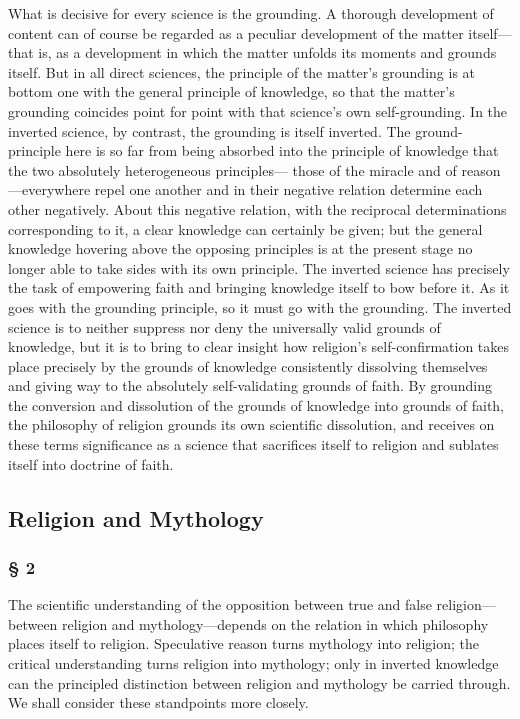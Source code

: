 \documentclass[12pt,a4paper]{article}
\begin{document}
What is decisive for every science is the grounding. A thorough
development of content can of course be regarded as a peculiar
development of the matter itself---that is, as a development in
which the matter unfolds its moments and grounds itself. But in
all direct sciences, the principle of the matter's grounding is
at bottom one with the general principle of knowledge, so that
the matter's grounding coincides point for point with that
science's own self-grounding. In the inverted science, by
contrast, the grounding is itself inverted. The ground-principle
here is so far from being absorbed into the principle of
knowledge that the two absolutely heterogeneous principles---
those of the miracle and of reason---everywhere repel one
another and in their negative relation determine each other
negatively. About this negative relation, with the
reciprocal determinations corresponding to it, a clear knowledge
can certainly be given; but the general knowledge hovering above
the opposing principles is at the present stage no longer able
to take sides with its own principle. The inverted science has
precisely the task of empowering faith and bringing knowledge
itself to bow before it. As it goes with the grounding
principle, so it must go with the grounding. The inverted
science is to neither suppress nor deny the universally valid
grounds of knowledge, but it is to bring to clear insight how
religion's self-confirmation takes place precisely by the
grounds of knowledge consistently dissolving themselves and
giving way to the absolutely self-validating grounds of faith.
By grounding the conversion and dissolution of the grounds of
knowledge into grounds of faith, the philosophy of religion
grounds its own scientific dissolution, and receives on these
terms significance as a science that sacrifices itself to
religion and sublates itself into doctrine of faith.

\subsection*{Religion and Mythology}
\subsubsection*{§ 2}

The scientific understanding of the opposition between true and
false religion---between religion and mythology---depends on the
relation in which philosophy places itself to religion.
Speculative reason turns mythology into religion; the critical
understanding turns religion into mythology; only in inverted
knowledge can the principled distinction between religion and
mythology be carried through. We shall consider these
standpoints more closely.
\end{document}
